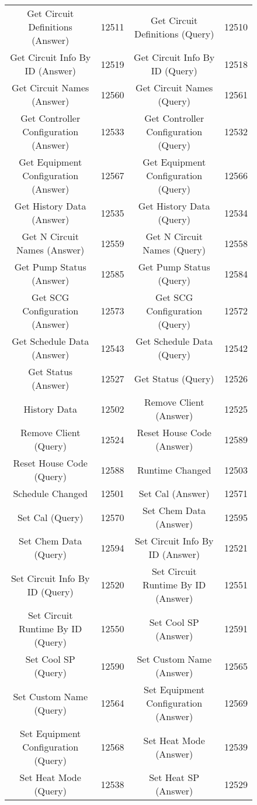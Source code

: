 \documentclass[11pt]{article}
\begin{document}
\begin{figure}[!h]
\begin{tabular}{ c | c || c | c}
Get Circuit Definitions (Answer) & 12511  & Get Circuit Definitions (Query) & 12510 \\ 
Get Circuit Info By ID (Answer) & 12519  & Get Circuit Info By ID (Query) & 12518 \\ 
Get Circuit Names (Answer) & 12560  & Get Circuit Names (Query) & 12561 \\ 
Get Controller Configuration (Answer) & 12533  & Get Controller Configuration (Query) & 12532 \\ 
Get Equipment Configuration (Answer) & 12567  & Get Equipment Configuration (Query) & 12566 \\ 
Get History Data (Answer) & 12535  & Get History Data (Query) & 12534 \\ 
Get N Circuit Names (Answer) & 12559  & Get N Circuit Names (Query) & 12558 \\ 
Get Pump Status (Answer) & 12585  & Get Pump Status (Query) & 12584 \\ 
Get SCG Configuration (Answer) & 12573  & Get SCG Configuration (Query) & 12572 \\ 
Get Schedule Data (Answer) & 12543  & Get Schedule Data (Query) & 12542 \\ 
Get Status (Answer) & 12527  & Get Status (Query) & 12526 \\ 
History Data & 12502  & Remove Client (Answer) & 12525 \\ 
Remove Client (Query) & 12524  & Reset House Code (Answer) & 12589 \\ 
Reset House Code (Query) & 12588  & Runtime Changed & 12503 \\ 
Schedule Changed & 12501  & Set Cal (Answer) & 12571 \\ 
Set Cal (Query) & 12570  & Set Chem Data (Answer) & 12595 \\ 
Set Chem Data (Query) & 12594  & Set Circuit Info By ID (Answer) & 12521 \\ 
Set Circuit Info By ID (Query) & 12520  & Set Circuit Runtime By ID (Answer) & 12551 \\ 
Set Circuit Runtime By ID (Query) & 12550  & Set Cool SP (Answer) & 12591 \\ 
Set Cool SP (Query) & 12590  & Set Custom Name (Answer) & 12565 \\ 
Set Custom Name (Query) & 12564  & Set Equipment Configuration (Answer) & 12569 \\ 
Set Equipment Configuration (Query) & 12568  & Set Heat Mode (Answer) & 12539 \\ 
Set Heat Mode (Query) & 12538  & Set Heat SP (Answer) & 12529 \\ 

\end{tabular}
\end{figure}
\end{document}

